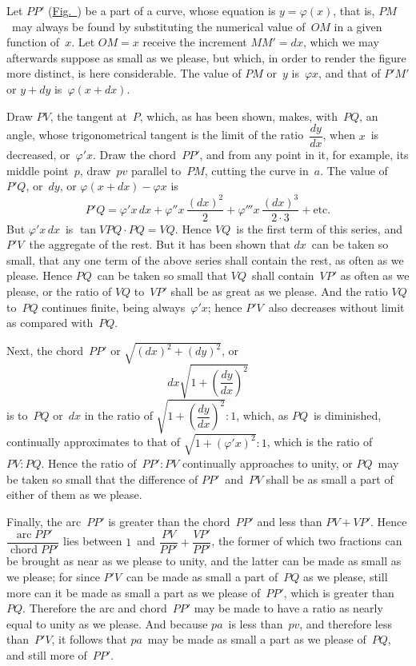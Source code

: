 \documentclass[12pt]{book}[2005/09/16]
\newcommand{\Fig}[2][Fig.]{\hyperref[fig:#2]{#1~{\upshape #2}}}
\newcommand{\Pagelabel}[1]{\phantomsection\label{page:#1}}
\newcommand{\PageSep}[1]{\Pagelabel{#1}\ignorespaces}
\renewcommand{\etc}{\text{etc}}
\renewcommand{\(}{{\upshape(}}
\renewcommand{\)}{{\upshape)}}
\DeclareMathOperator{\arc}{arc}
\DeclareMathOperator{\chord}{chord}
\renewcommand{\phi}{\varphi}
\begin{document}
Let $PP'$ (\Fig{4}) be a part of a curve, whose equation
is $y = \phi(x)$, that is, $PM$~may always be found by
substituting the numerical value of~$OM$ in a given
function of~$x$. Let $OM = x$ receive the increment
$MM' = dx$, which we may afterwards suppose as small
as we please, but which, in order to render the figure
more distinct, is here considerable. The value of $PM$
or~$y$ is~$\phi x$, and that of $P'M'$ or $y + dy$ is~$\phi(x +  dx)$.

Draw $PV$, the tangent at~$P$, which, as has been
%
shown, makes, with~$PQ$, an angle, whose trigonometrical
tangent is the limit of the ratio~$\dfrac{dy}{dx}$, when $x$~is decreased,
or~$\phi' x$. Draw the chord~$PP'$, and from any
\PageSep{41}
point in it, for example, its middle point~$p$, draw~$pv$
parallel to~$PM$, cutting the curve in~$a$. The value of~$P'Q$,
or~$dy$, or $\phi(x + dx) - \phi x$ is %
\[
P'Q = \phi' x\, dx
    + \phi'' x\, \frac{(dx)^{2}}{2}
    + \phi''' x\, \frac{(dx)^{3}}{2·3} + \etc.
\]
But $\phi' x\, dx$~is $\tan VPQ·PQ = VQ$. Hence $VQ$~is the
first term of this series, and $P'V$~the aggregate of the
rest. But it has been shown that $dx$~can be taken so
small, that any one term of the above series shall contain
the rest, as often as we please. Hence $PQ$~can
be taken so small that $VQ$~shall contain~$VP'$ as often
as we please, or the ratio of $VQ$ to~$VP'$ shall be as
great as we please. And the ratio $VQ$ to~$PQ$ continues
finite, being always~$\phi' x$; hence $P'V$~also decreases
without limit as compared with~$PQ$.

Next, the chord~$PP'$ or $\sqrt{(dx)^{2} + (dy)^{2}}$, or
\[
dx \sqrt{1 + \left(\frac{dy}{dx}\right)^{2}}
\]
is to~$PQ$ or~$dx$ in the ratio of $\sqrt{1 + \left(\dfrac{dy}{dx}\right)^{2}} : 1$, which,
as $PQ$~is diminished, continually approximates to that
of $\sqrt{1 + (\phi' x)^{2}} : 1$, which is the ratio of~$PV : PQ$.
Hence the ratio of~$PP' : PV$ continually approaches to
unity, or $PQ$~may be taken so small that the difference
of $PP'$~and~$PV$ shall be as small a part of either
of them as we please.

Finally, the arc~$PP'$ is greater than the chord~$PP'$
and less than $PV + VP'$. Hence $\dfrac{\arc PP'}{\chord PP'}$ lies between
$1$~and $\dfrac{PV}{PP'} + \dfrac{VP'}{PP'}$, the former of which two
fractions can be brought as near as we please to unity,
and the latter can be made as small as we please; for
\PageSep{42}
since $P'V$~can be made as small a part of~$PQ$ as we
please, still more can it be made as small a part as we
please of~$PP'$, which is greater than~$PQ$. Therefore
the arc and chord~$PP'$ may be made to have a ratio as
nearly equal to unity as we please. And because $pa$~is
less than~$pv$, and therefore less than~$P'V$, it follows
that $pa$~may be made as small a part as we please of~$PQ$,
and still more of~$PP'$.
\end{document}
